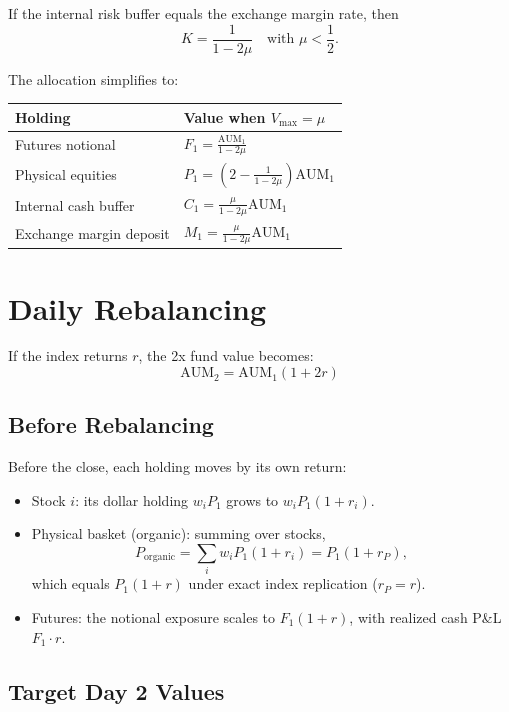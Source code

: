 \documentclass[11pt]{article}
\begin{document}
If the internal risk buffer equals the exchange margin rate, then
\[
  K = \frac{1}{1 - 2\mu} \quad \text{with } \mu < \frac{1}{2}.
\]

The allocation simplifies to:

\begin{center}
\begin{tabular}{@{}ll@{}}
\toprule
Holding & Value when $V_{\mathrm{max}} = \mu$ \\
\midrule
Futures notional & $F_1 = \frac{\mathrm{AUM}_1}{1 - 2\mu}$ \\
Physical equities & $P_1 = \left(2 - \frac{1}{1 - 2\mu}\right)\mathrm{AUM}_1$ \\
Internal cash buffer & $C_1 = \frac{\mu}{1 - 2\mu}\mathrm{AUM}_1$ \\
Exchange margin deposit & $M_1 = \frac{\mu}{1 - 2\mu}\mathrm{AUM}_1$ \\
\bottomrule
\end{tabular}
\end{center}

\section{Daily Rebalancing}

If the index returns $r$, the 2x fund value becomes:
\[
  \mathrm{AUM}_2 = \mathrm{AUM}_1(1 + 2r)
\]

\subsection{Before Rebalancing}

Before the close, each holding moves by its own return:
\begin{itemize}
  \item Stock $i$: its dollar holding $w_i P_1$ grows to $w_i P_1(1 + r_i)$.
  \item Physical basket (organic): summing over stocks,
  \[
    P_{\mathrm{organic}} = \sum_i w_i P_1(1 + r_i) = P_1(1 + r_P),
  \]
  which equals $P_1(1 + r)$ under exact index replication ($r_P = r$).
  \item Futures: the notional exposure scales to $F_1(1 + r)$, with realized
  cash P\&L $F_1 \cdot r$.
\end{itemize}

\subsection{Target Day 2 Values}
\end{document}
